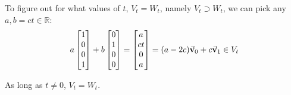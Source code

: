 \documentclass{article}
\begin{document}
\begin{exercise}{12}
\begin{enumerate}
To figure out for what values of $t$, $V_t = W_t$, namely $V_t \supset W_t$, we can pick any $a, b=ct \in \mathbb{R}$:
$$a\begin{bmatrix}1\\0\\0\\1\end{bmatrix} + b\begin{bmatrix}0\\1\\0\\0\end{bmatrix} = \begin{bmatrix}a\\ct\\0\\a\end{bmatrix} = (a-2c)\vec{\mathbf{v}}_0 + c\vec{\mathbf{v}}_1 \in V_t$$

As long as $t \neq 0$, $V_t = W_t$.
\end{enumerate}
\end{exercise}

\newpage

\end{document}
